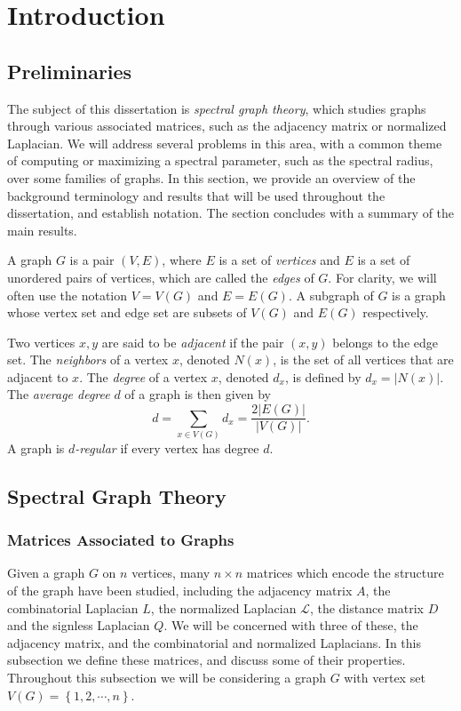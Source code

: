 \chapter{Introduction}

\section{Preliminaries}

The subject of this dissertation is \textit{spectral graph theory}, which studies graphs through
various associated matrices, such as the adjacency matrix or normalized Laplacian.
We will address several problems in this area, with a common theme
of computing or maximizing a spectral parameter, such as the spectral radius, over some families of graphs.  
In this section, we provide an overview of the background terminology and results that will be used throughout the
dissertation, and establish notation.  The section concludes with a summary of the main results.


A graph $G$ is a pair $(V,E)$, where $E$ is a set of \textit{vertices} and $E$ is a set of unordered
pairs of vertices, which are called the \textit{edges} of $G$.  For clarity, we will often
use the notation $V = V(G)$ and $E = E(G)$.  A subgraph of $G$ is a graph whose vertex set and
edge set are subsets of $V(G)$ and $E(G)$ respectively.


Two vertices $x,y$ are said to be \textit{adjacent}
if the pair $(x,y)$ belongs to the edge set.  The \textit{neighbors} of a vertex $x$, denoted $N(x)$,
is the set of all vertices that are adjacent to $x$.  The \textit{degree} of a vertex $x$, denoted $d_x$,
is defined by $d_x = |N(x)|$.  The \textit{average degree} $d$ of a graph is then given by
\[ d = \sum_{x \in V(G)} d_x = \frac{2 |E(G)|}{|V(G)|}. \]
A graph is \textit{$d$-regular} if every vertex has degree $d$.



\section{Spectral Graph Theory}

\subsection{Matrices Associated to Graphs}


Given a graph $G$ on $n$ vertices, many $n \times n$ matrices which encode the structure
of the graph have been studied, including the adjacency matrix $A$, the combinatorial Laplacian $L$,
the normalized Laplacian $\mathcal{L}$, the distance matrix $D$ and the signless Laplacian $Q$.
We will be concerned with three of these, the adjacency matrix, and the combinatorial and normalized
Laplacians.  In this subsection we define these matrices, and discuss some of their properties.
Throughout this subsection we will be considering a graph $G$ with vertex set
$V(G) = \left\{ 1,2, \cdots, n\right\}$.



